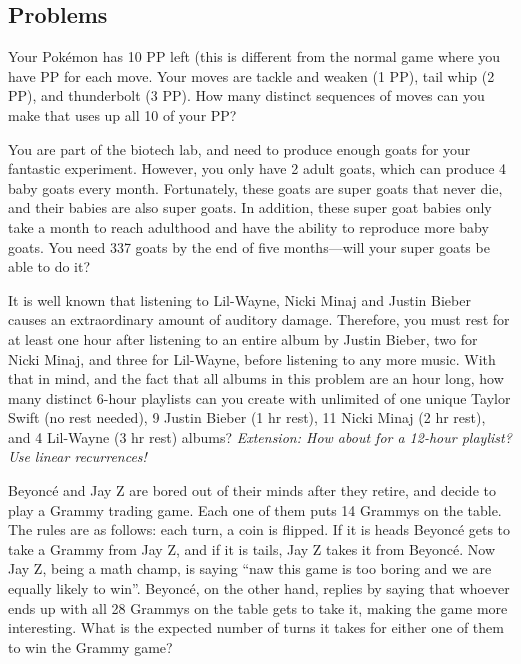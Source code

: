 \subsection{Problems}
\begin{problem}
Your Pok\'{e}mon has 10 PP left (this is different from the normal game where you have PP for each move. Your moves are tackle and weaken (1 PP), tail whip (2 PP),  and thunderbolt (3 PP). How many distinct sequences of moves can you make that uses up all 10 of your PP?
\end{problem}

\begin{problem}You are part of the biotech lab, and need to produce enough goats for your fantastic experiment. However, you only have 2 adult goats, which can produce 4 baby goats every month. Fortunately, these goats are super goats that never die, and their babies are also super goats. In addition, these super goat babies only take a month to reach adulthood and have the ability to reproduce more baby goats. You need 337 goats by the end of five months---will your super goats be able to do it?
\end{problem}
\begin{problem} It is well known that listening to Lil-Wayne, Nicki Minaj and Justin Bieber causes an extraordinary amount of auditory damage. Therefore, you must rest for at least one hour after listening to an entire album by Justin Bieber, two for Nicki Minaj, and three for Lil-Wayne, before listening to any more music. With that in mind, and the fact that all albums in this problem are an hour long, how many distinct 6-hour playlists can you create with unlimited of one unique Taylor Swift (no rest needed), 9 Justin Bieber (1 hr rest), 11 Nicki Minaj (2 hr rest), and 4 Lil-Wayne (3 hr rest) albums? \textit{Extension: How about for a 12-hour playlist? Use linear recurrences!}
\end{problem}
\begin{problem}Beyonc\'{e} and Jay Z are bored out of their minds after they retire, and decide to play a Grammy trading game. Each one of them puts 14 Grammys on the table. The rules are as follows: each turn, a coin is flipped. If it is heads Beyonc\'{e} gets to take a Grammy from Jay Z, and if it is tails, Jay Z takes it from Beyonc\'{e}. Now Jay Z, being a math champ, is saying ``naw this game is too boring and we are equally likely to win''. Beyonc\'{e}, on the other hand, replies by saying that whoever ends up with all 28 Grammys on the table gets to take it, making the game more interesting. What is the expected number of turns it takes for either one of them to win the Grammy game?
\end{problem}


